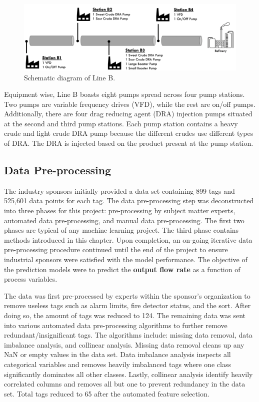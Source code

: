 \begin{figure}[h]
    \centering
    \includegraphics[scale=0.33]{images/suncor/08RM06A.png}
    \caption{Schematic diagram of Line B.}
    \label{fig:02RM06A}
\end{figure}

Equipment wise, Line B boasts eight pumps spread across four pump stations. Two pumps are variable frequency drives (VFD), while the rest are on/off pumps. Additionally, there are four drag reducing agent (DRA) injection pumps situated at the second and third pump stations. Each pump station contains a heavy crude and light crude DRA pump because the different crudes use different types of DRA.  The DRA is injected based on the product present at the pump station. 

\subsection{Data Pre-processing}
The industry sponsors initially provided a data set containing 899 tags and 525,601 data points for each tag.  The data pre-processing step was deconstructed into three phases for this project: pre-processing by subject matter experts, automated data pre-processing, and manual data pre-processing. The first two phases are typical of any machine learning project.  The third phase contains methods introduced in this chapter. Upon completion, an on-going iterative data pre-processing procedure continued until the end of the project to ensure industrial sponsors were satisfied with the model performance. The objective of the prediction models were to predict the \textbf{output flow rate} as a function of process variables.

The data was first pre-processed by experts within the sponsor's organization to remove useless tags such as alarm limits, fire detector status, and the sort.  After doing so, the amount of tags was reduced to 124.  The remaining data was sent into various automated data pre-processing algorithms to further remove redundant/insignificant tags.  The algorithms include: missing data removal, data imbalance analysis, and collinear analysis.  Missing data removal cleans up any NaN or empty values in the data set.  Data imbalance analysis inspects all categorical variables and removes heavily imbalanced tags where one class significantly dominates all other classes.  Lastly, collinear analysis identify heavily correlated columns and removes all but one to prevent redundancy in the data set. Total tags reduced to 65 after the automated feature selection.

